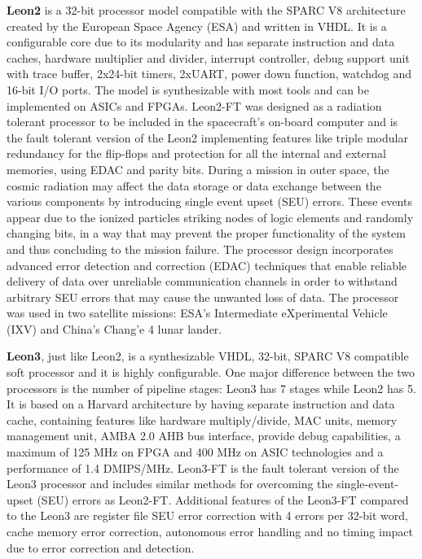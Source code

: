 \hspace{0.5cm} \textbf{Leon2} is a 32-bit processor model compatible with the SPARC V8 architecture created by the European Space Agency (ESA) and written in VHDL. It is a configurable core due to
its modularity and has separate instruction and data caches, hardware multiplier and divider,
interrupt controller, debug support unit with trace buffer, 2x24-bit timers, 2xUART, power
down function, watchdog and 16-bit I/O ports. The model is synthesizable with most tools
and can be implemented on ASICs and FPGAs.
Leon2-FT was designed as a radiation tolerant processor to be included in the spacecraft’s
on-board computer and is the fault tolerant version of the Leon2 implementing features like triple modular redundancy for the flip-flops and protection for all the internal and external
memories, using EDAC and parity bits. During a mission in outer space, the cosmic radiation
may affect the data storage or data exchange between the various components by introducing
single event upset (SEU) errors. These events appear due to the ionized particles striking
nodes of logic elements and randomly changing bits, in a way that may prevent the proper
functionality of the system and thus concluding to the mission failure. The processor design
incorporates advanced error detection and correction (EDAC) techniques that enable reliable
delivery of data over unreliable communication channels in order to withstand arbitrary SEU
errors that may cause the unwanted loss of data. The processor was used in two satellite
missions: ESA’s Intermediate eXperimental Vehicle (IXV) and China’s Chang’e 4 lunar
lander. \cite{ESALEON2}\cite{wikiLEON2}

\hspace{0.5cm} \textbf{Leon3}, just like Leon2, is a synthesizable VHDL, 32-bit, SPARC V8 compatible soft
processor and it is highly configurable. One major difference between the two processors is
the number of pipeline stages: Leon3 has 7 stages while Leon2 has 5. It is based on a Harvard
architecture by having separate instruction and data cache, containing features like hardware
multiply/divide, MAC units, memory management unit, AMBA 2.0 AHB bus interface,
provide debug capabilities, a maximum of 125 MHz on FPGA and 400 MHz on ASIC
technologies and a performance of 1.4 DMIPS/MHz. Leon3-FT is the fault tolerant version of
the Leon3 processor and includes similar methods for overcoming the single-event-upset
(SEU) errors as Leon2-FT. Additional features of the Leon3-FT compared to the Leon3 are
register file SEU error correction with 4 errors per 32-bit word, cache memory error
correction, autonomous error handling and no timing impact due to error correction and
detection. \cite{wikiLEON2}\cite{GaislerLEON3FT}

